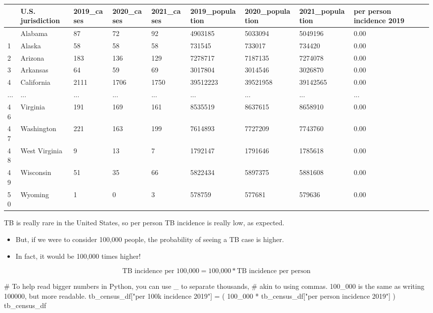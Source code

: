 \documentclass[
  letterpaper,
  DIV=11,
  numbers=noendperiod]{scrreprt}
\newenvironment{Shaded}{\begin{snugshade}}{\end{snugshade}}
\newcommand{\CommentTok}[1]{\textcolor[rgb]{0.37,0.37,0.37}{#1}}
\newcommand{\DecValTok}[1]{\textcolor[rgb]{0.68,0.00,0.00}{#1}}
\newcommand{\NormalTok}[1]{\textcolor[rgb]{0.00,0.23,0.31}{#1}}
\newcommand{\OperatorTok}[1]{\textcolor[rgb]{0.37,0.37,0.37}{#1}}
\newcommand{\StringTok}[1]{\textcolor[rgb]{0.13,0.47,0.30}{#1}}
\begin{document}
\begin{longtable}[]{@{}lllllllll@{}}
\toprule\noalign{}
& U.S. jurisdiction & 2019\_cases & 2020\_cases & 2021\_cases &
2019\_population & 2020\_population & 2021\_population & per person
incidence 2019 \\
\midrule\noalign{}
\endhead
\bottomrule\noalign{}
\endlastfoot
0 & Alabama & 87 & 72 & 92 & 4903185 & 5033094 & 5049196 & 0.00 \\
1 & Alaska & 58 & 58 & 58 & 731545 & 733017 & 734420 & 0.00 \\
2 & Arizona & 183 & 136 & 129 & 7278717 & 7187135 & 7274078 & 0.00 \\
3 & Arkansas & 64 & 59 & 69 & 3017804 & 3014546 & 3026870 & 0.00 \\
4 & California & 2111 & 1706 & 1750 & 39512223 & 39521958 & 39142565 &
0.00 \\
... & ... & ... & ... & ... & ... & ... & ... & ... \\
46 & Virginia & 191 & 169 & 161 & 8535519 & 8637615 & 8658910 & 0.00 \\
47 & Washington & 221 & 163 & 199 & 7614893 & 7727209 & 7743760 &
0.00 \\
48 & West Virginia & 9 & 13 & 7 & 1792147 & 1791646 & 1785618 & 0.00 \\
49 & Wisconsin & 51 & 35 & 66 & 5822434 & 5897375 & 5881608 & 0.00 \\
50 & Wyoming & 1 & 0 & 3 & 578759 & 577681 & 579636 & 0.00 \\
\end{longtable}

TB is really rare in the United States, so per person TB incidence is
really low, as expected.

\begin{itemize}
\item
  But, if we were to consider 100,000 people, the probability of seeing
  a TB case is higher.
\item
  In fact, it would be 100,000 times higher!
\end{itemize}

\[\text{TB incidence per 100,000} = \text{100,000} * \text{TB incidence per person}\]

\begin{Shaded}
\begin{Highlighting}[]
\CommentTok{\# To help read bigger numbers in Python, you can use \_ to separate thousands,}
\CommentTok{\# akin to using commas. 100\_000 is the same as writing 100000, but more readable.}
\NormalTok{tb\_census\_df[}\StringTok{"per 100k incidence 2019"}\NormalTok{] }\OperatorTok{=}\NormalTok{ (}
    \DecValTok{100\_000} \OperatorTok{*}\NormalTok{ tb\_census\_df[}\StringTok{"per person incidence 2019"}\NormalTok{] }
\NormalTok{)}
\NormalTok{tb\_census\_df}
\end{Highlighting}
\end{Shaded}
\end{document}
